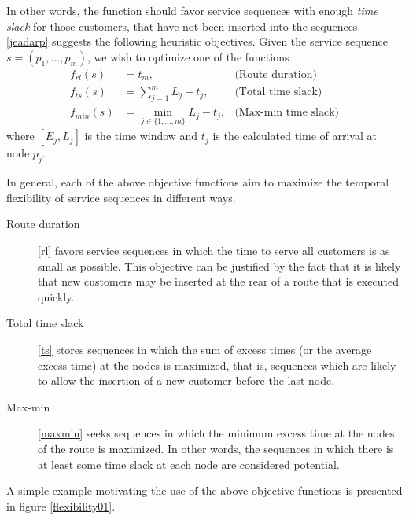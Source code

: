 \documentclass[dissertation,draft*]{aaltoseries}
\begin{document}
In other words, the function should favor service sequences with enough 
\emph{time slack} for those customers, that have not been inserted into the sequences.
\ref{jeadarp} suggests the following heuristic objectives.
Given the service sequence $s = (p_1, \ldots, p_{m})$, we wish to optimize one 
of the functions 
\begin{align}
\label{rl}
f_{rl}(s) &= t_m, & \mbox{(Route duration)} \\
\label{ts}
f_{ts}(s) & = \sum_{j=1}^{m} L_j -t_j ,  & \mbox{(Total time slack)} \\
\label{maxmin}
f_{min}(s) &= \min_{j \in \{1, \ldots, m\}}  L_j - t_j, & \mbox{(Max-min time slack)} 
\end{align}
where $[E_j,L_j]$ is the time window and $t_j$ is the calculated time of arrival at node $p_j$.

In general, each of the above objective functions aim to 
maximize the temporal flexibility of service sequences in different ways.
\begin{description}
\item[Route duration]
\eqref{rl} favors service sequences in
which the time to serve all customers is as small as possible. 
This objective can be justified by the fact that 
it is likely that new customers may be inserted at the rear of 
a route that is executed quickly.
\item[Total time slack] 
\eqref{ts} stores sequences in which
the sum of excess times (or the average excess time) at the nodes is maximized, that
is, sequences which are likely to allow the insertion of a new customer %
before the last node.
\item[Max-min] \eqref{maxmin} seeks sequences in which the 
minimum excess time at the nodes of the route is maximized. In other words,
the sequences in which there is at least some time slack at each node
are considered potential.
\end{description}

A simple example motivating the use of the above objective functions is 
presented in figure \ref{flexibility01}.
\end{document}
